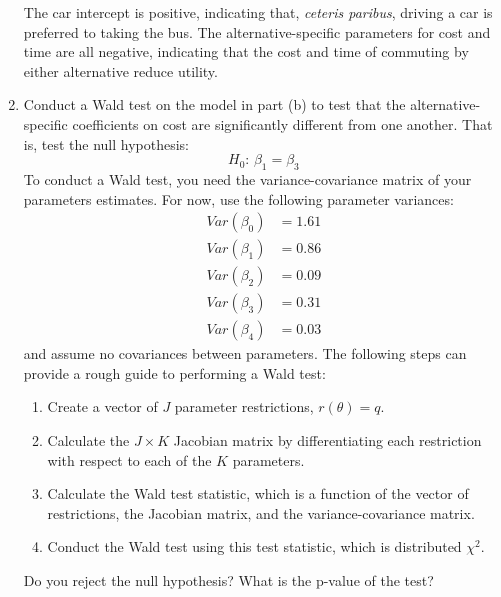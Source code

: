 \documentclass[11pt,letterpaper]{article}\usepackage[]{graphicx}\usepackage[]{color}
\begin{document}
\begin{enumerate}[label=\alph*., leftmargin=*]
	The car intercept is positive, indicating that, \emph{ceteris paribus}, driving a car is preferred to taking the bus. The alternative-specific parameters for cost and time are all negative, indicating that the cost and time of commuting by either alternative reduce utility.

	\item Conduct a Wald test on the model in part (b) to test that the alternative-specific coefficients on cost are significantly different from one another. That is, test the null hypothesis:
	$$H_0 \text{: } \beta_1 = \beta_3$$
	To conduct a Wald test, you need the variance-covariance matrix of your parameters estimates. For now, use the following parameter variances:
	\begin{align*}
		Var(\beta_0) &= 1.61 \\
		Var(\beta_1) &= 0.86 \\
		Var(\beta_2) &= 0.09 \\
		Var(\beta_3) &= 0.31 \\
		Var(\beta_4) &= 0.03
	\end{align*}
	and assume no covariances between parameters. The following steps can provide a rough guide to performing a Wald test:
	\begin{enumerate}[label=\Roman*.]
		\item Create a vector of $J$ parameter restrictions, $r(\theta) = q$.
		\item Calculate the $J \times K$ Jacobian matrix by differentiating each restriction with respect to each of the $K$ parameters.
		\item Calculate the Wald test statistic, which is a function of the vector of restrictions, the Jacobian matrix, and the variance-covariance matrix.
		\item Conduct the Wald test using this test statistic, which is distributed $\chi^2$.
	\end{enumerate}
	Do you reject the null hypothesis? What is the p-value of the test?


\end{enumerate}
\end{document}
